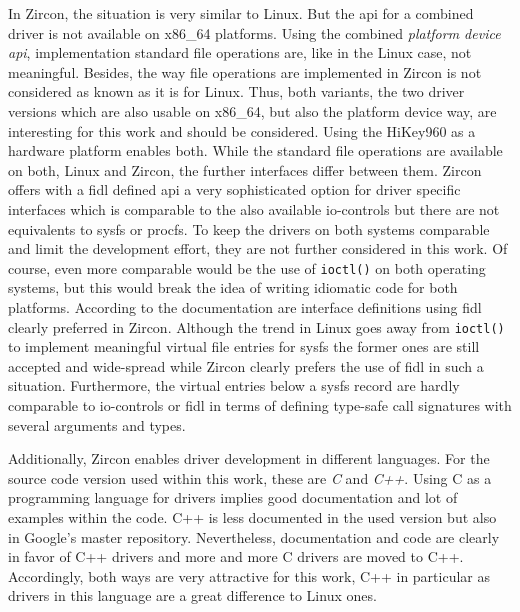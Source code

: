 In Zircon, the situation is very similar to Linux.
But the \ac{api} for a combined driver is not available on x86\_64 platforms.
Using the combined \textit{platform device \ac{api}}, implementation standard file operations are, like in the Linux case, not meaningful.
Besides, the way file operations are implemented in Zircon is not considered as known as it is for Linux.
Thus, both variants, the two driver versions which are also usable on x86\_64, but also the platform device way, are interesting for this work and should be considered.
Using the HiKey960 as a hardware platform enables both.
While the standard file operations are available on both, Linux and Zircon, the further interfaces differ between them.
Zircon offers with a \ac{fidl} defined \acs{api} a very sophisticated option for driver specific interfaces which is comparable to the also available \ac{io}-controls but there are not equivalents to sysfs or procfs.
To keep the drivers on both systems comparable and limit the development effort, they are not further considered in this work.
Of course, even more comparable would be the use of \texttt{ioctl()} on both operating systems, but this would break the idea of writing idiomatic code for both platforms.
According to the documentation are interface definitions using \ac{fidl} clearly preferred in Zircon\cite{zircon-ddk-gettingstarted}.
Although the trend in Linux goes away from \texttt{ioctl()} to implement meaningful virtual file entries for sysfs the former ones are still accepted and wide-spread while Zircon clearly prefers the use of \ac{fidl} in such a situation.
Furthermore, the virtual entries below a sysfs record are hardly comparable to \ac{io}-controls or \ac{fidl} in terms of defining type-safe call signatures with several arguments and types.

Additionally, Zircon enables driver development in different languages.
For the source code version used within this work, these are \textit{C} and \textit{C++}.
Using C as a programming language for drivers implies good documentation and lot of examples within the code.
C++ is less documented in the used version but also in Google's master repository.
Nevertheless, documentation and code are clearly in favor of C++ drivers and more and more C drivers are moved to C++.
Accordingly, both ways are very attractive for this work, C++ in particular as drivers in this language are a great difference to Linux ones.

